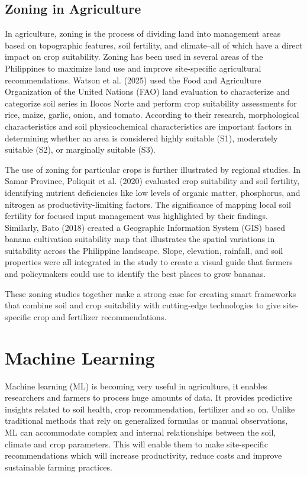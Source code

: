 {\subsection{Zoning in Agriculture}

In agriculture, zoning is the process of dividing land into management areas based on topographic features, soil fertility, and climate–all of which have a direct impact on crop suitability. Zoning has been used in several areas of the Philippines to maximize land use and improve site-specific agricultural recommendations. Watson et al. (2025) used the Food and Agriculture Organization of the United Nations (FAO) land evaluation to characterize and categorize soil series in Ilocos Norte and perform crop suitability assessments for rice, maize, garlic, onion, and tomato. According to their research, morphological characteristics and soil physicochemical characteristics are important factors in determining whether an area is considered highly suitable (S1), moderately suitable (S2), or marginally suitable (S3).

The use of zoning for particular crops is further illustrated by regional studies. In Samar Province, Poliquit et al. (2020) evaluated crop suitability and soil fertility, identifying nutrient deficiencies like low levels of organic matter, phosphorus, and nitrogen as productivity-limiting factors. The significance of mapping local soil fertility for focused input management was highlighted by their findings. Similarly, Bato (2018) created a Geographic Information System (GIS) based banana cultivation suitability map that illustrates the spatial variations in suitability across the Philippine landscape. Slope, elevation, rainfall, and soil properties were all integrated in the study to create a visual guide that farmers and policymakers could use to identify the best places to grow bananas.

These zoning studies together make a strong case for creating smart frameworks that combine soil and crop suitability with cutting-edge technologies to give site-specific crop and fertilizer recommendations.

\section{Machine Learning}
Machine learning (ML) is becoming very useful in agriculture, it enables researchers and farmers to process huge amounts of data. It provides predictive insights related to soil health, crop recommendation, fertilizer and so on. Unlike traditional methods that rely on generalized formulas or manual observations, ML can accommodate complex and internal relationships between the soil, climate and crop parameters. This will enable them to make site-specific recommendations which will increase productivity, reduce costs and improve sustainable farming practices.

}
